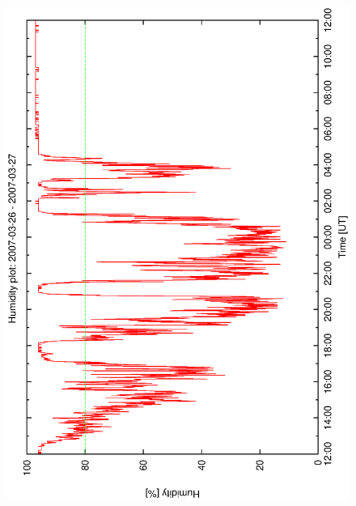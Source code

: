 \begin{figure}[htbp]
\begin{center}
{    \includegraphics[scale=0.25, angle=-90]{figures/ecs/hum_1_2007_03_26.eps}
  }
\end{center}
\end{figure}
